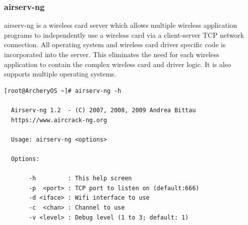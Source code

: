 \documentclass{article}
\begin{document}
\subsubsection{airserv-ng}
airserv-ng is a wireless card server which allows multiple wireless application programs to independently use a wireless card via  a  client-server TCP network connection. All operating system and wireless card driver specific code is incorporated into the server. This eliminates the  need  for each  wireless application to contain the complex wireless card and driver logic. It is also supports multiple operating systems.
\begin{lstlisting}
[root@ArcheryOS ~]# airserv-ng -h

  Airserv-ng 1.2  - (C) 2007, 2008, 2009 Andrea Bittau
  https://www.aircrack-ng.org

  Usage: airserv-ng <options>

  Options:

       -h         : This help screen
       -p  <port> : TCP port to listen on (default:666)
       -d <iface> : Wifi interface to use
       -c  <chan> : Channel to use
       -v <level> : Debug level (1 to 3; default: 1)
\end{lstlisting}
\end{document}
